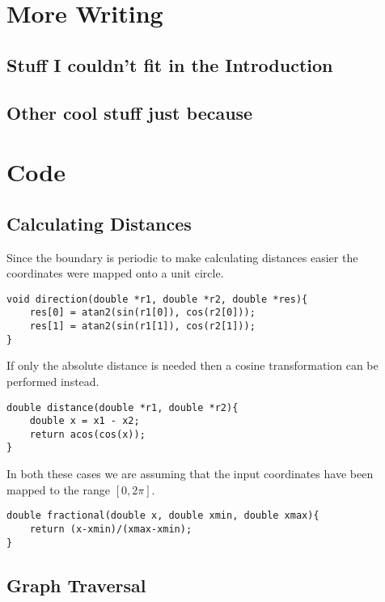 \backmatter

\chapter{More Writing}

\section{Stuff I couldn't fit in the Introduction}

\section{Other cool stuff just because}

\chapter{Code}

\section{Calculating Distances}

Since the boundary is periodic to make calculating distances easier the coordinates were mapped onto a unit circle. 

\begin{lstlisting}[language=myc]
void direction(double *r1, double *r2, double *res){
    res[0] = atan2(sin(r1[0]), cos(r2[0]));
    res[1] = atan2(sin(r1[1]), cos(r2[1]));
}
\end{lstlisting}

If only the absolute distance is needed then a cosine transformation can be performed instead.

\begin{lstlisting}[language=myc]
double distance(double *r1, double *r2){
    double x = x1 - x2;
    return acos(cos(x));
}
\end{lstlisting}

In both these cases we are assuming that the input coordinates have been mapped to the range $[0,2\pi]$.

\begin{lstlisting}[language=myc]
double fractional(double x, double xmin, double xmax){
    return (x-xmin)/(xmax-xmin);
}

\end{lstlisting}

\section{Graph Traversal}

